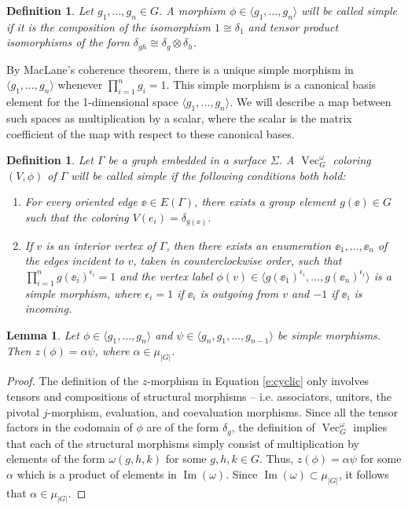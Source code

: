 \documentclass{amsart}
\newtheorem{lem}[thm]{Lemma}
\newtheorem{defn}[thm]{Definition}
\DeclareMathOperator{\Vect}{Vec}
\DeclareMathOperator{\Img}{Im}
\newcommand{\one}{1}
\newcommand{\Si}{\Sigma}
\begin{document}
\begin{defn} \label{def:simple_morphism}
Let $g_1, \ldots, g_n \in G$.  A morphism $\phi \in \langle g_1, \ldots, g_n \rangle$ will be called \emph{simple} if it is the composition of the isomorphism $\one \cong \delta_1$ and  tensor product isomorphisms of the form $\delta_{gh} \cong \delta_g \otimes \delta_h$.
\end{defn}

By MacLane's coherence theorem, there is a unique simple morphism in $\langle g_1, \ldots, g_n \rangle$ whenever $\prod_{i=1}^n g_i = 1$. This simple morphism is a canonical basis element for the 1-dimensional space $\langle g_1, \ldots, g_n \rangle$.  We will describe a map between such spaces as multiplication by a scalar, where the scalar is the matrix coefficient of the map with respect to these canonical bases.

\begin{defn} \label{def:simple_graph}
Let $\Gamma$ be a graph embedded in a surface $\Si$.  A $\Vect_G^\omega$ coloring $(V, \phi)$ of $\Gamma$ will be called \emph{simple} if the following conditions both hold: 
\begin{enumerate}
\item For every oriented edge $\ee \in E(\Gamma)$, there exists a group element $g(\ee) \in G$ such that
the coloring $V(e_i) = \delta_{g(\ee)}$.
\item If $v$ is an interior vertex of $\Gamma$, then there exists an enumeration  $\ee_1, \dots, \ee_n$ of the edges incident to $v$, taken in counterclockwise order, such that $\prod_{i=1}^n g(\ee_i)^{\epsilon_i} = 1$ and  the vertex label $\phi(v) \in \langle g(\ee_1)^{\epsilon_i}, \ldots, g(\ee_n)^{\epsilon_i} \rangle$ is a simple morphism, where $\epsilon_i = 1$ if $\ee_i$ is outgoing from $v$ and $-1$ if $\ee_i$ is incoming.
\end{enumerate}
\end{defn}

\begin{lem} \label{lem:z_simple}
Let $\phi \in \langle g_1, \ldots, g_n \rangle$ and $\psi \in \langle g_n, g_1, \ldots, g_{n-1} \rangle$ be simple morphisms.  Then $z(\phi) = \alpha \psi$, where $\alpha \in \mu_{|G|}$.
\end{lem}
\begin{proof}
The definition of the $z$-morphism in Equation \ref{e:cyclic} only involves tensors and compositions of structural morphisms -- i.e. associators, unitors, the pivotal $j$-morphism, evaluation, and coevaluation morphisms.  Since all the tensor factors in the codomain of $\phi$ are of the form $\delta_g$, the definition of $\Vect_G^\omega$ implies that each of the structural morphisms simply consist of multiplication by elements of the form $\omega(g,h,k)$ for some $g,h,k \in G$. Thus, $z(\phi) = \alpha \psi$ for some $\alpha$ which is a product of elements in $\Img(\omega)$.   Since $\Img(\omega) \subset \mu_{|G|}$, it follows that $\alpha \in \mu_{|G|}$.
\end{proof}
\end{document}
